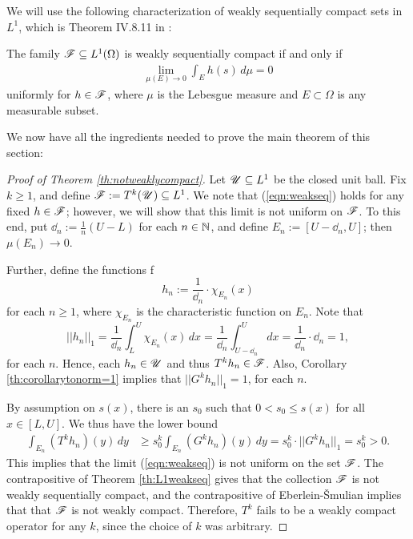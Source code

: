 We will use the following characterization of weakly sequentially compact sets in $L^1$, which is Theorem IV.8.11 in \cite{Dunford1958}:

\begin{theorem} \label{th:L1weakseq}
	The family $\mathscr F \subseteq L^1(\Omega)$ is weakly sequentially compact if and only if
	\begin{align}
		\lim_{\mu(E) \to 0} \int_E h(s) \, d\mu =0 \label{eqn:weakseq}
	\end{align}
	uniformly for $h \in \mathscr F$, where $\mu$ is the Lebesgue measure and $E \subset \Omega$ is any measurable subset.
\end{theorem}

We now have all the ingredients needed to prove the main theorem of this section:

\begin{proof}[Proof of Theorem \ref{th:notweaklycompact}]
	Let $\mathscr  U \subseteq L^1$ be the closed unit ball. Fix $k \geq 1$, and define $\mathscr F:=T^k(\mathscr U) \subseteq L^1$. We note that (\ref{eqn:weakseq}) holds for any fixed $h \in \mathscr F$; however, we will show that this limit is not uniform on $\mathscr F$. To this end, put $\dd_n:= \frac 1n (U-L)$ for each $n \in \mathbb{N}$, and define $E_n:=[U-\dd_n,U]$; then $\mu(E_n) \to 0$.
	
	Further, define the functions
	f\[h_n:= \frac{1}{\dd_n} \cdot \chi_{E_n}(x)\]
	for each $n \geq 1$, where $\chi_{E_n}$ is the characteristic function on $E_n$. Note that
	\[||h_n||_1 = \frac{1}{\dd_n} \int_L^U \chi_{E_n}(x) \, dx = \frac{1}{\dd_n} \int_{U-\dd_n}^U dx = \frac{1}{\dd_n} \cdot \dd_n = 1,\]
	for each $n$. Hence, each $h_n \in \mathscr U$ and thus $T^kh_n \in \mathscr F$. Also, Corollary \ref{th:corollarytonorm=1} implies that $||G^k h_n||_1 = 1$, for each $n$.
	
	By assumption on $s(x)$, there is an $s_0$ such that $0 < s_0 \leq s(x)$ for all $x \in [L,U]$. We thus have the lower bound
	\begin{align*}
		\int_{E_n} (T^k h_n)(y) \, dy &\geq s_0^k \int_{E_n} (G^k h_n)(y) \, dy = s_0 ^k \cdot ||G^k h_n||_1 = s_0^k > 0.
	\end{align*}
	This implies that the limit (\ref{eqn:weakseq}) is not uniform on the set $\mathscr F$. The contrapositive of Theorem \ref{th:L1weakseq} gives that the collection $\mathscr F$ is not weakly sequentially compact, and the contrapositive of Eberlein-\v{S}mulian implies that that $\mathscr F$ is not weakly compact. Therefore, $T^k$ fails to be a weakly compact operator for any $k$, since the choice of $k$ was arbitrary.
	
\end{proof}

